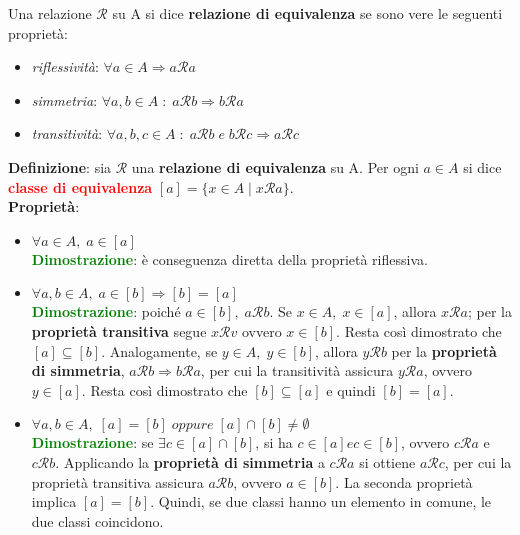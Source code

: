 Una relazione $\mathcal{R}$ su A si dice \textbf{relazione di equivalenza} se sono vere le seguenti proprietà:
\begin{itemize}[nosep]
    \item \textit{riflessività}: $\forall a \in A \Rightarrow a\mathcal{R}a$
    \item \textit{simmetria}: $\forall a,b \in A \; : \; a\mathcal{R}b \Rightarrow b\mathcal{R}a$
    \item \textit{transitività}: $\forall a,b,c \in A \; : \; a\mathcal{R}b \; e \; b\mathcal{R}c \Rightarrow a\mathcal{R}c$
\end{itemize}
\textbf{Definizione}: sia $\mathcal{R}$ una \textbf{relazione di equivalenza} su A. Per ogni $a \in A$ si dice \textcolor{red}{\textbf{classe di equivalenza}} $[a] = \{x \in A \; | \; x\mathcal{R}a\}$. \\ \newline
\textbf{Proprietà}:
\begin{itemize}[nosep]
    \item $\forall a \in A, \; a \in [a]$ \\
          \textcolor{green}{\textbf{Dimostrazione}}: è conseguenza diretta della proprietà riflessiva.
    \item $\forall a,b \in A, \; a \in [b] \Rightarrow [b] = [a]$ \\
          \textcolor{green}{\textbf{Dimostrazione}}: poiché $a \in [b], \; a\mathcal{R}b$. Se $x \in A, \; x \in [a]$, allora $x\mathcal{R}a$; per la \textbf{proprietà transitiva} segue $x\mathcal{R}v$ ovvero $x \in [b]$. Resta così dimostrato che $[a] \subseteq [b]$. Analogamente, se $y \in A, \; y \in [b]$, allora $y\mathcal{R}b$ per la \textbf{proprietà di simmetria}, $a\mathcal{R}b \Rightarrow b\mathcal{R}a$, per cui la transitività assicura $y\mathcal{R}a$, ovvero $y \in [a]$. Resta così dimostrato che $[b] \subseteq [a]$ e quindi $[b] = [a]$.
    \item $\forall a,b \in A, \; [a] = [b] \; oppure \; [a] \cap [b] \neq \emptyset$ \\
          \textcolor{green}{\textbf{Dimostrazione}}: se $\exists c \in [a] \cap [b]$, si ha $c \in [a] e c \in [b]$, ovvero $c\mathcal{R}a$ e $c\mathcal{R}b$. Applicando la \textbf{proprietà di simmetria} a $c\mathcal{R}a$ si ottiene $a\mathcal{R}c$, per cui la proprietà transitiva assicura $a\mathcal{R}b$, ovvero $a \in [b]$. La seconda proprietà implica $[a] = [b]$. Quindi, se due classi hanno un elemento in comune, le due classi coincidono.
\end{itemize}
